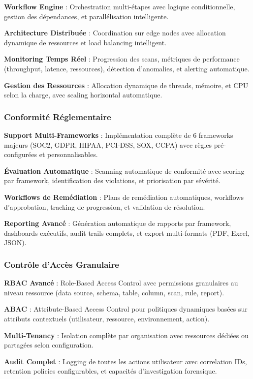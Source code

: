 \textbf{Workflow Engine} : Orchestration multi-étapes avec logique conditionnelle, gestion des dépendances, et parallélisation intelligente.

\textbf{Architecture Distribuée} : Coordination sur edge nodes avec allocation dynamique de ressources et load balancing intelligent.

\textbf{Monitoring Temps Réel} : Progression des scans, métriques de performance (throughput, latence, ressources), détection d'anomalies, et alerting automatique.

\textbf{Gestion des Ressources} : Allocation dynamique de threads, mémoire, et CPU selon la charge, avec scaling horizontal automatique.

\subsubsection{Conformité Réglementaire}

\textbf{Support Multi-Frameworks} : Implémentation complète de 6 frameworks majeurs (SOC2, GDPR, HIPAA, PCI-DSS, SOX, CCPA) avec règles pré-configurées et personnalisables.

\textbf{Évaluation Automatique} : Scanning automatique de conformité avec scoring par framework, identification des violations, et priorisation par sévérité.

\textbf{Workflows de Remédiation} : Plans de remédiation automatiques, workflows d'approbation, tracking de progression, et validation de résolution.

\textbf{Reporting Avancé} : Génération automatique de rapports par framework, dashboards exécutifs, audit trails complets, et export multi-formats (PDF, Excel, JSON).

\subsubsection{Contrôle d'Accès Granulaire}

\textbf{RBAC Avancé} : Role-Based Access Control avec permissions granulaires au niveau ressource (data source, schema, table, column, scan, rule, report).

\textbf{ABAC} : Attribute-Based Access Control pour politiques dynamiques basées sur attributs contextuels (utilisateur, ressource, environnement, action).

\textbf{Multi-Tenancy} : Isolation complète par organisation avec ressources dédiées ou partagées selon configuration.

\textbf{Audit Complet} : Logging de toutes les actions utilisateur avec correlation IDs, retention policies configurables, et capacités d'investigation forensique.

